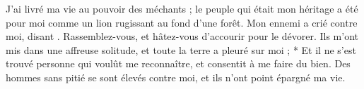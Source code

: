 J’ai livré ma vie au pouvoir des méchants ; le peuple qui était mon héritage a été pour moi comme un lion rugissant au fond d’une forêt. Mon ennemi a crié contre moi, disant . Rassemblez-vous, et hâtez-vous d’accourir pour le dévorer. Ils m’ont mis dans une affreuse solitude, et toute la terre a pleuré sur moi ; * Et il ne s’est trouvé personne qui voulût me reconnaître, et consentit à me faire du bien.
\versseparator
Des hommes sans pitié se sont élevés contre moi, et ils n’ont point épargné ma vie.

